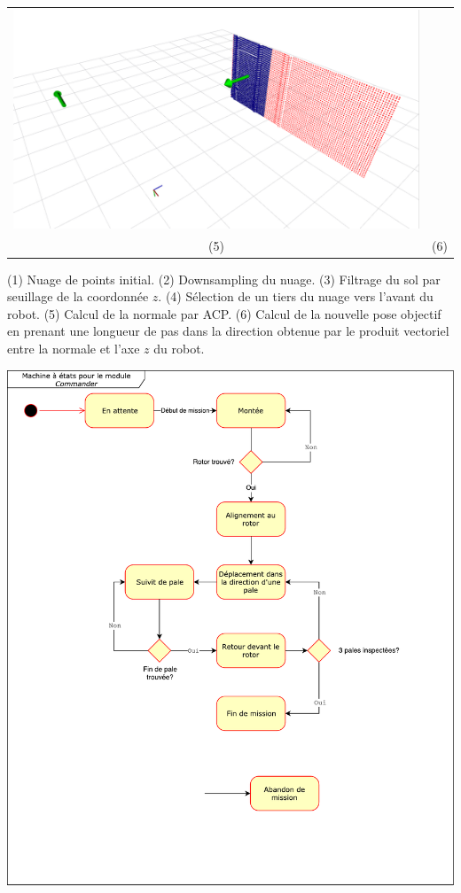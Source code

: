 \begin{tabular}{cc}
  \includegraphics[width=0.5\linewidth]{images/pcl/Selection_065} \\
  (5) & (6)
\end{tabular}
\setlength{\tabcolsep}{\savedtabcolsep}

(1) Nuage de points initial. (2) Downsampling du nuage. (3) Filtrage du sol par seuillage de la coordonnée $z$. (4) Sélection de un tiers du nuage vers l'avant du robot. (5) Calcul de la normale par ACP. (6) Calcul de la nouvelle pose objectif en prenant une longueur de pas dans la direction obtenue par le produit vectoriel entre la normale et l'axe $z$ du robot.

\includegraphics[width=\linewidth]{images/state_machine.pdf}
\label{annexe:state_machine}

